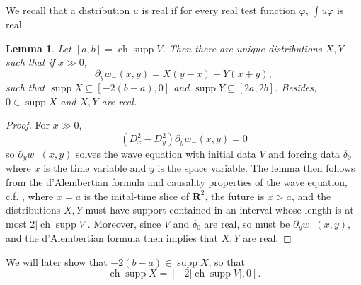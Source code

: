 \documentclass[12pt]{report}
\newcommand{\RR}{\mathbf{R}}
\DeclareMathOperator{\ch}{ch}
\DeclareMathOperator{\supp}{supp}
\newtheorem{lemma}[theorem]{Lemma}
\theoremstyle{definition}
\begin{document}
We recall that a distribution $u$ is real if for every real test function $\varphi$, $\int u\varphi$ is real.
\begin{lemma}
\label{construction of intertwining, part 2}
Let $[a, b] = \ch \supp V$. Then there are unique distributions $X,Y$ such that if $x \gg 0$,
$$\partial_yw_-(x, y) = X(y - x) + Y(x + y),$$
such that $\supp X \subseteq [-2(b-a), 0]$ and $\supp Y \subseteq [2a, 2b]$.
Besides, $0 \in \supp X$ and $X,Y$ are real.
\end{lemma}
\begin{proof}
For $x \gg 0$,
$$(D_x^2 - D_y^2)\partial_yw_-(x, y) = 0$$
so $\partial_yw_-(x, y)$ solves the wave equation with initial data $V$ and forcing data $\delta_0$ where $x$ is the time variable and $y$ is the space variable.
The lemma then follows from the d'Alembertian formula and causality properties of the wave equation, c.f. \cite[\S2.4.1a]{evans10}, where $x = a$ is the inital-time slice of $\RR^2$, the future is $x > a$, and the distributions $X,Y$ must have support contained in an interval whose length is at most $2|\ch \supp V|$.
Moreover, since $V$ and $\delta_0$ are real, so must be $\partial_yw_-(x, y)$, and the d'Alembertian formula then implies that $X,Y$ are real.
\end{proof}
We will later show that $-2(b - a) \in \supp X$, so that
$$\ch \supp X = [-2|\ch \supp V|, 0].$$
\end{document}

